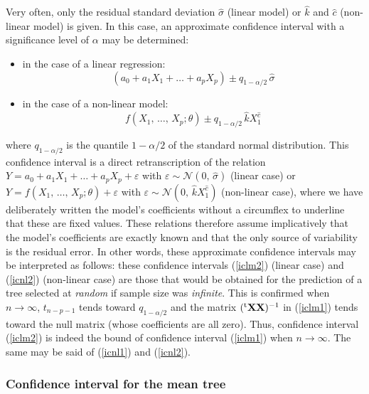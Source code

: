 Very often, only the residual standard deviation $\hat{\sigma}$ (linear model) or $\hat{k}$ and $\hat{c}$ (non-linear model) is given. In this case, an approximate confidence interval with a significance level of $\alpha$
may be determined:
\begin{itemize}
\item in the case of a linear regression:
\begin{equation}
(a_0+a_1X_1+\ldots+a_pX_p)\pm q_{1-\alpha/2}\,\hat{\sigma}
\label{iclm2}
\end{equation}
\item in the case of a non-linear model:
\begin{equation}
f(X_1,\,\ldots,\,X_p;\theta)\pm
q_{1-\alpha/2}\,\hat{k}X_1^{\hat{c}} \label{icnl2}
\end{equation}
\end{itemize}
where $q_{1-\alpha/2}$ is the quantile $1-\alpha/2$ of the standard normal distribution. This confidence interval is a direct retranscription of the relation 
$Y=a_0+a_1X_1+\ldots+a_pX_p+\varepsilon$ with
$\varepsilon\sim\mathcal{N}(0,\,\hat{\sigma})$ (linear case) or 
$Y=f(X_1,\,\ldots,\,X_p;\theta)+\varepsilon$ with
$\varepsilon\sim\mathcal{N}(0,\,\hat{k}X_1^{\hat{c}})$ (non-linear case), where we have deliberately written the model's coefficients without a circumflex to underline that these are fixed values. These relations therefore assume implicatively that the model's coefficients are exactly known and that the only source of variability is the residual error. In other words, these approximate confidence intervals may be interpreted as follows: these confidence intervals (\ref{iclm2}) (linear case) and (\ref{icnl2}) (non-linear case) are those that would be obtained for the prediction of a tree selected at \emph{random} if sample size was \emph{infinite}. This is confirmed when $n\rightarrow\infty$, $t_{n-p-1}$ tends toward $q_{1-\alpha/2}$ and the matrix $({}^{\mathrm{t}}\mathbf{X}\mathbf{X})^{-1}$ in
(\ref{iclm1}) tends toward the null matrix (whose coefficients are all zero). Thus, confidence interval 
(\ref{iclm2}) is indeed the bound of confidence interval 
(\ref{iclm1}) when $n\rightarrow\infty$. The same may be said of 
(\ref{icnl1}) and (\ref{icnl2}).

\subsubsection{Confidence interval for the mean tree}

